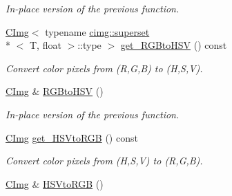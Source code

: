 \begin{DoxyCompactItemize}
\begin{DoxyCompactList}\small\item\em In-\/place version of the previous function. \end{DoxyCompactList}\item 
\hypertarget{structcimg__library_1_1_c_img_a238bd0a5b23bebd51806a6be68e36b7f}{\hyperlink{structcimg__library_1_1_c_img}{C\-Img}$<$ typename \hyperlink{structcimg__library_1_1cimg_1_1superset}{cimg\-::superset}\\*
$<$ T, float $>$\-::type $>$ \hyperlink{structcimg__library_1_1_c_img_a238bd0a5b23bebd51806a6be68e36b7f}{get\-\_\-\-R\-G\-Bto\-H\-S\-V} () const }\label{structcimg__library_1_1_c_img_a238bd0a5b23bebd51806a6be68e36b7f}

\begin{DoxyCompactList}\small\item\em Convert color pixels from (R,G,B) to (H,S,V). \end{DoxyCompactList}\item 
\hypertarget{structcimg__library_1_1_c_img_a461f298887519c01842d1285d35a13c7}{\hyperlink{structcimg__library_1_1_c_img}{C\-Img} \& \hyperlink{structcimg__library_1_1_c_img_a461f298887519c01842d1285d35a13c7}{R\-G\-Bto\-H\-S\-V} ()}\label{structcimg__library_1_1_c_img_a461f298887519c01842d1285d35a13c7}

\begin{DoxyCompactList}\small\item\em In-\/place version of the previous function. \end{DoxyCompactList}\item 
\hypertarget{structcimg__library_1_1_c_img_a262941bc2ee334163e5e7ada7b5eabf7}{\hyperlink{structcimg__library_1_1_c_img}{C\-Img} \hyperlink{structcimg__library_1_1_c_img_a262941bc2ee334163e5e7ada7b5eabf7}{get\-\_\-\-H\-S\-Vto\-R\-G\-B} () const }\label{structcimg__library_1_1_c_img_a262941bc2ee334163e5e7ada7b5eabf7}

\begin{DoxyCompactList}\small\item\em Convert color pixels from (H,S,V) to (R,G,B). \end{DoxyCompactList}\item 
\hypertarget{structcimg__library_1_1_c_img_a76049902fc796e72e197519fc5c58b8b}{\hyperlink{structcimg__library_1_1_c_img}{C\-Img} \& \hyperlink{structcimg__library_1_1_c_img_a76049902fc796e72e197519fc5c58b8b}{H\-S\-Vto\-R\-G\-B} ()}\label{structcimg__library_1_1_c_img_a76049902fc796e72e197519fc5c58b8b}


\end{DoxyCompactItemize}
